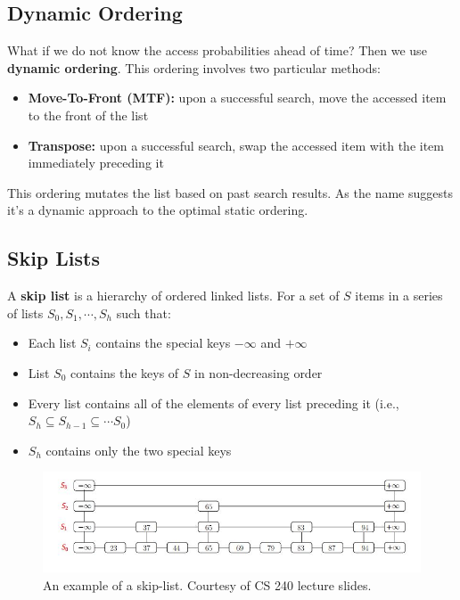 \documentclass{report}
\begin{document}
\subsection{Dynamic Ordering}
What if we do not know the access probabilities ahead of time? Then we use \textbf{dynamic ordering}. This ordering involves two particular methods:
\begin{itemize}
\item \textbf{Move-To-Front (MTF):} upon a successful search, move the accessed item to the front of the list
\item \textbf{Transpose:} upon a successful search, swap the accessed item with the item immediately preceding it
\end{itemize}
This ordering mutates the list based on past search results. As the name suggests it's a dynamic approach to the optimal static ordering.
\subsection{Skip Lists}
A \textbf{skip list} is a hierarchy of ordered linked lists. For a set of $S$ items in a series of lists $S_0,S_1, \cdots, S_h$ such that:
\begin{itemize}
\item Each list $S_i$ contains the special keys $-\infty$ and $+\infty$
\item List $S_0$ contains the keys of $S$ in non-decreasing order
\item Every list contains all of the elements of every list preceding it (i.e., $S_h \subseteq S_{h-1} \subseteq \cdots S_0$)
\item $S_h$ contains only the two special keys
\end{itemize}
\begin{figure}[ht]
\begin{center}
\includegraphics[scale=0.8]{skip-list.jpg}
\end{center}
\caption{An example of a skip-list. Courtesy of CS 240 lecture slides.}
\end{figure}
\end{document}
